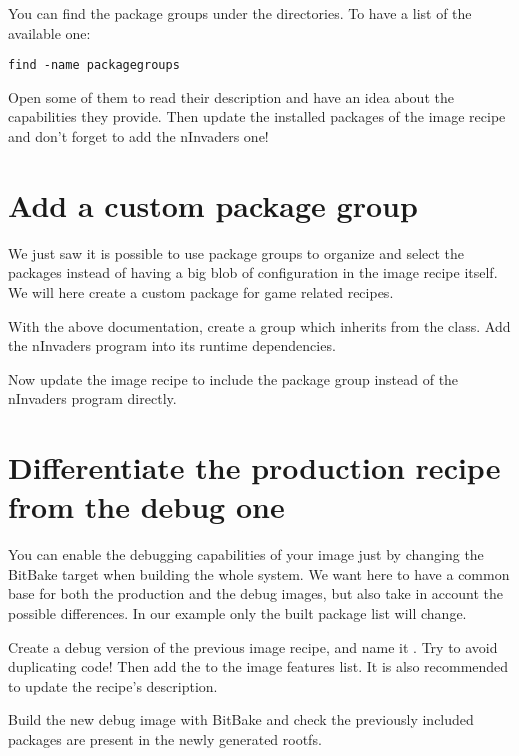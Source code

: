 You can find the package groups under the  directories. To
have a list of the available one:
\begin{verbatim}
find -name packagegroups
\end{verbatim}

Open some of them to read their description and have an idea about the
capabilities they provide. Then update the installed packages of the image
recipe and don't forget to add the nInvaders one!

\section{Add a custom package group}

We just saw it is possible to use package groups to organize and select the
packages instead of having a big blob of configuration in the image recipe
itself. We will here create a custom package for game related recipes.

With the above documentation, create a  group
which inherits from the  class. Add the nInvaders program
into its runtime dependencies.

Now update the image recipe to include the package group instead of the
nInvaders program directly.

\section{Differentiate the production recipe from the debug one}

You can enable the debugging capabilities of your image just by changing the
BitBake target when building the whole system. We want here to have a common
base for both the production and the debug images, but also take in account the
possible differences. In our example only the built package list will change.

Create a debug version of the previous image recipe, and name it
. Try to avoid duplicating code! Then add the
 to the image features list. It is also recommended to
update the recipe's description.

Build the new debug image with BitBake and check the previously
included packages are present in the newly generated rootfs.
